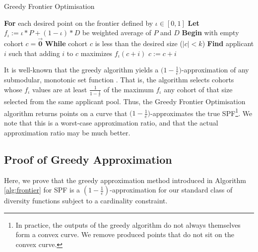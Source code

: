 \begin{algorithm}
    \caption{Greedy Frontier Optimisation}\label{alg:frontier}
    \begin{algorithmic}
    \State \textbf{For} each desired point on the frontier defined by $\iota \in [0, 1]$
    \State \hspace{\algorithmicindent} \textbf{Let} $f_{\iota} := \iota*P+(1-\iota)*D$ be weighted average of $P$ and $D$
    \State \hspace{\algorithmicindent} \textbf{Begin} with empty cohort $c = \vec{\mathbf{0}}$
    \State \hspace{\algorithmicindent} \textbf{While} cohort $c$ is less than the desired size ($|c| < k$)
    \State \hspace{\algorithmicindent} \hspace{\algorithmicindent} \textbf{Find} applicant $i$ such that adding $i$ to $c$ maximizes $f_{\iota}(c + i)$
    \State \hspace{\algorithmicindent} \hspace{\algorithmicindent} $c := c + i$
    \end{algorithmic}
\end{algorithm}


It is well-known that the greedy algorithm yields a $\bigl( 1-\frac{1}{e} \bigr)$-approximation of any submodular, monotonic set function \cite{bordeaux_submodular_2014}. That is, the algorithm selects cohorts whose $f_\iota$ values are at least $\frac{1}{1-\frac{1}{e}}$ of the maximum $f_\iota$ any cohort of that size selected from the same applicant pool. Thus, the Greedy Frontier Optimisation algorithm returns points on a curve that $\bigl( 1-\frac{1}{e} \bigr)$-approximates the true SPF\footnote{In practice, the outputs of the greedy algorithm do not always themselves form a convex curve. We remove produced points that do not sit on the convex curve.}. We note that this is a worst-case approximation ratio, and that the actual approximation ratio may be much better.

\subsection{Proof of Greedy Approximation}
Here, we prove that the greedy approximation method introduced in Algorithm \ref{alg:frontier} for SPF is a $(1-\frac{1}{e})$-approximation for our standard class of diversity functions subject to a cardinality constraint.


